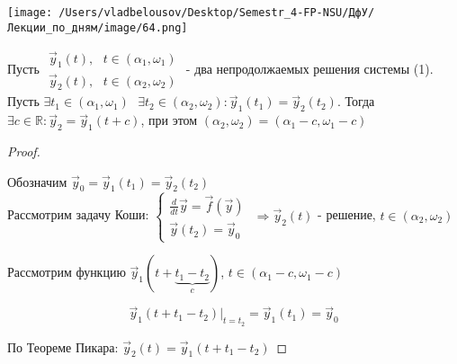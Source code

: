 \documentclass[12pt, a4paper]{report}
\begin{document}
\begin{center}
    \texttt{[image: /Users/vladbelousov/Desktop/Semestr\_4-FP-NSU/ДфУ/Лекции\_по\_дням/image/64.png]}
\end{center}

\begin{theorem}
    Пусть \(\begin{aligned}
        \vec{ y } _1 (t ) , \text{ }  t \in  (\alpha_1 , \omega_1 ) \\ 
        \vec{ y }  _2 (t ) ,\text{ }  t \in  (\alpha_2 , \omega_2 )
    \end{aligned}\) - два непродолжаемых решения системы (1). Пусть \( \exists  t_1 \in  (\alpha_1 , \omega_1 ) \text{ }  \exists  t_2 \in (\alpha_2 , \omega_2 ) : \vec{ y}  _1 (t_1 ) = \vec{ y } _2 (t_2 ) \). Тогда \( \exists  c \in \mathbb{R} : \vec{ y}  _2 = \vec{ y}  _1 (t +c) \), при этом \( (\alpha_2, \omega_2) = (\alpha_1 - c , \omega_1 - c )\) 
\end{theorem}

\begin{proof} \(  \) 

    Обозначим \( \vec{ y } _0 = \vec{ y } _1 (t_1 ) = \vec{ y}  _2 (t_2) \)\\ 

    Рассмотрим задачу Коши: \( \begin{cases}
    \displaystyle \frac{d}{dt }  \vec{ y}  = \vec{ f }  (\vec{ y} )\\ 
    \vec{ y}  (t_2 ) = \vec{ y}  _0
    \end{cases} \) \( \Rightarrow \vec{ y}  _2 (t )  \) - решение, \(  t \in  (\alpha_2 , \omega_2 ) \) 

    Рассмотрим функцию \( \vec{y } _1 (t+\underbrace{ t_1 - t_2 }_{c}) \), \(  t \in  (\alpha_1 - c , \omega_1 - c) \) 

    \[ \vec{ y }  _1 (t + t_1 - t_2 ) |_{t = t_2 } = \vec{y } _1 (t_1 ) = \vec{ y}  _0  \] 

    По Теореме Пикара: \( \vec{ y } _2 (t ) = \vec{ y}  _1 (t + t_1 -t_2) \) 

\end{proof}


\ifdefined\mainfile
\else
    
\end{document}
